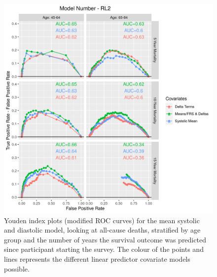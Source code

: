 \documentclass[
]{article}
\begin{document}
\begin{figure}
\centering
\includegraphics{./Rmarkdown_Plots/ROC_CAx-Covariates_EventType_RL2.png}
\caption{Youden index plots (modified ROC curves) for the mean systolic and diastolic model, looking at all-cause deaths, stratified by age group and the number of years the survival outcome was predicted since participant starting the survey. The colour of the points and lines represents the different linear predictor covariate models possible.}\label{fig:ROC_RL2}
\end{figure}
\end{document}
